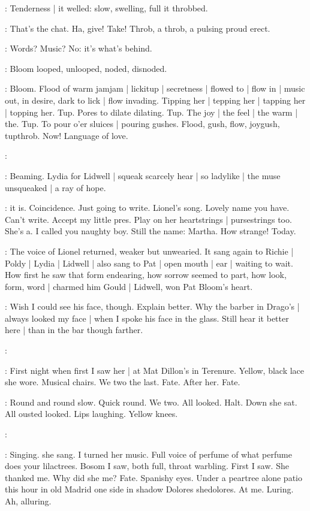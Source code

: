 :
Tenderness |
it welled:
slow,
swelling,
full it throbbed.

\BloomInt:
That's the chat.
Ha,
give!
Take!
Throb,
a throb,
a pulsing proud erect.

\BloomInt:
Words?
Music?
No:
it's what's behind.

:
Bloom looped,
unlooped,
noded,
disnoded.

\BloomInt:
Bloom.
Flood of warm jamjam |
lickitup |
secretness |
flowed to |
flow in |
music out,
in desire,
dark to lick |
flow invading.
Tipping her |
tepping her |
tapping her |
topping her.
Tup.
Pores to dilate dilating.
Tup.
The joy |
the feel |
the warm |
the.
Tup.
To pour o'er sluices |
pouring gushes.
Flood,
gush,
flow,
joygush,
tupthrob.
Now!
Language of love.

\simon:

:
Beaming.
Lydia for Lidwell |
squeak scarcely hear |
so ladylike |
the muse unsqueaked |
a ray of hope.

\BloomInt:
 it is.
Coincidence.
Just going to write.
Lionel's song.
Lovely name you have.
Can't write.
Accept my little pres.
Play on her heartstrings |
pursestrings too.
She's a.
I called you naughty boy.
Still the name:
Martha.
How strange!
Today.

:
The voice of Lionel returned,
weaker but unwearied.
It sang again to Richie |
Poldy |
Lydia |
Lidwell |
also sang to Pat |
open mouth |
ear |
waiting to wait.
How first he saw that form endearing,
how sorrow seemed to part,
how look,
form,
word |
charmed him
Gould |
Lidwell,
won Pat Bloom's heart.

\BloomInt:
Wish I could see his face,
though.
Explain better.
Why the barber in Drago's |
always looked my face |
when I spoke his face in the glass.
Still hear it better here |
than in the bar though farther.

\simon:

\BloomInt:
First night when first I saw her |
at Mat Dillon's in Terenure.
Yellow,
black lace she wore.
Musical chairs.
We two the last.
Fate.
After her.
Fate.

\BloomInt:
Round and round slow.
Quick round.
We two.
All looked.
Halt.
Down she
sat.
All ousted looked.
Lips laughing.
Yellow knees.

\simon:

\BloomInt:
Singing.
 she sang.
I turned her music.
Full voice of perfume
of what perfume does your lilactrees.
Bosom I saw,
both full,
throat
warbling.
First I saw.
She thanked me.
Why did she me?
Fate.
Spanishy
eyes.
Under a peartree alone patio this hour in old Madrid one side in
shadow Dolores shedolores.
At me.
Luring.
Ah,
alluring.

